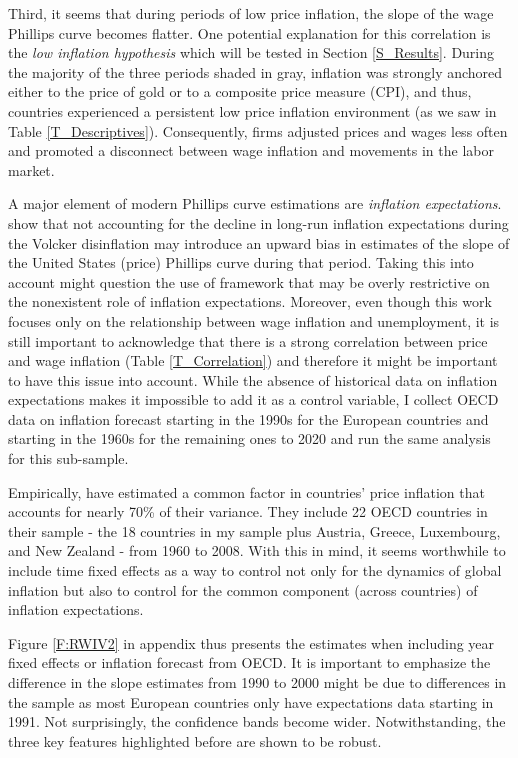 \documentclass[12pt]{article}
\begin{document}
Third, it seems that during periods of low price inflation, the slope of the wage Phillips curve becomes flatter. One potential explanation for this correlation is the \textit{low inflation hypothesis} which will be tested in Section \ref{S_Results}. During the majority of the three periods shaded in gray, inflation was strongly anchored either to the price of gold or to a composite price measure (CPI), and thus, countries experienced a persistent low price inflation environment (as we saw in Table \ref{T_Descriptives}). Consequently, firms adjusted prices and wages less often \citep{Gagnon2009, Nakamura2018, Alvarez2019} and promoted a disconnect between wage inflation and movements in the labor market.%

A major element of modern Phillips curve estimations are \textit{inflation expectations}. \cite{Hazell2021} show that not accounting for the decline in long-run inflation expectations during the Volcker disinflation may introduce an upward bias in estimates of the slope of the United States (price) Phillips curve during that period. Taking this into account might question the use of \cite{Gali2011} framework that may be overly restrictive on the nonexistent role of inflation expectations. Moreover, even though this work focuses only on the relationship between wage inflation and unemployment, it is still important to acknowledge that there is a strong correlation between price and wage inflation (Table \ref{T_Correlation}) and therefore it might be important to have this issue into account. While the absence of historical data on inflation expectations makes it impossible to add it as a control variable, I collect OECD data on inflation forecast starting in the 1990s for the European countries and starting in the 1960s for the remaining ones to 2020 and run the same analysis for this sub-sample.

Empirically, \cite{Ciccarelli2010} have estimated a common factor in countries' price inflation that accounts for nearly 70\% of their variance. They include 22 OECD countries in their sample - the 18 countries in my sample plus Austria, Greece, Luxembourg, and New Zealand - from 1960 to 2008. With this in mind, it seems worthwhile to include time fixed effects as a way to control not only for the dynamics of global inflation but also to control for the common component (across countries) of inflation expectations.

Figure \ref{F:RWIV2} in appendix thus presents the estimates when including year fixed effects or inflation forecast from OECD. It is important to emphasize the difference in the slope estimates from 1990 to 2000 might be due to differences in the sample as most European countries only have expectations data starting in 1991. Not surprisingly, the confidence bands become wider. Notwithstanding, the three key features highlighted before are shown to be robust.
\end{document}
